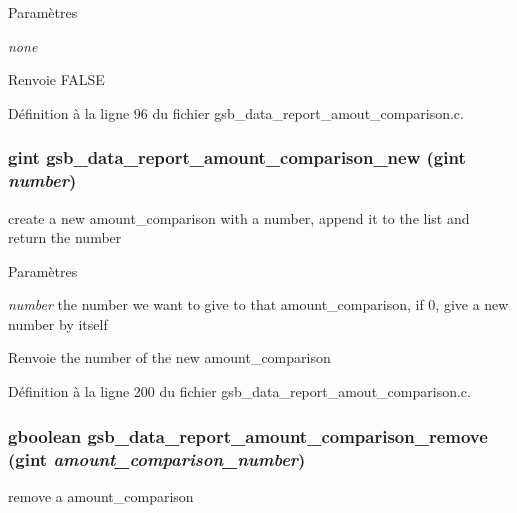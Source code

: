 \begin{DoxyParams}{Paramètres}
\item[{\em none}]\end{DoxyParams}
\begin{DoxyReturn}{Renvoie}
FALSE 
\end{DoxyReturn}


Définition à la ligne 96 du fichier gsb\_\-data\_\-report\_\-amout\_\-comparison.c.

\subsubsection[{gsb\_\-data\_\-report\_\-amount\_\-comparison\_\-new}]{\setlength{\rightskip}{0pt plus 5cm}gint gsb\_\-data\_\-report\_\-amount\_\-comparison\_\-new (gint {\em number})}\label{gsb__data__report__amout__comparison_8h_a68750f00e0800724678fadc6245433eb}
create a new amount\_\-comparison with a number, append it to the list and return the number


\begin{DoxyParams}{Paramètres}
\item[{\em number}]the number we want to give to that amount\_\-comparison, if 0, give a new number by itself\end{DoxyParams}
\begin{DoxyReturn}{Renvoie}
the number of the new amount\_\-comparison 
\end{DoxyReturn}


Définition à la ligne 200 du fichier gsb\_\-data\_\-report\_\-amout\_\-comparison.c.

\subsubsection[{gsb\_\-data\_\-report\_\-amount\_\-comparison\_\-remove}]{\setlength{\rightskip}{0pt plus 5cm}gboolean gsb\_\-data\_\-report\_\-amount\_\-comparison\_\-remove (gint {\em amount\_\-comparison\_\-number})}\label{gsb__data__report__amout__comparison_8h_a619ca7f05d61b5181fdf004d786d73c2}
remove a amount\_\-comparison


